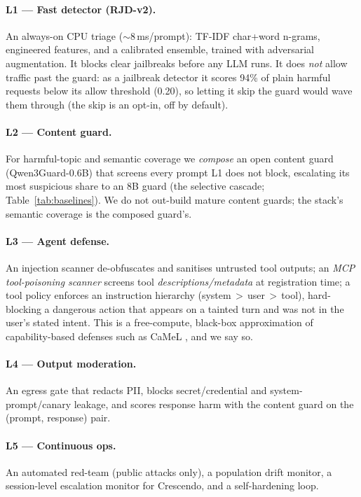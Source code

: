 \documentclass[11pt]{article}
\begin{document}
\paragraph{L1 --- Fast detector (RJD-v2).} An always-on CPU triage ($\sim$8\,ms/prompt):
TF-IDF char+word n-grams, engineered features, and a calibrated ensemble, trained with adversarial
augmentation. It blocks clear jailbreaks before any LLM runs. It does \emph{not} allow traffic past
the guard: as a jailbreak detector it scores 94\% of plain harmful requests below its allow threshold
(0.20), so letting it skip the guard would wave them through (the skip is an opt-in, off by default).

\paragraph{L2 --- Content guard.} For harmful-topic and semantic coverage we \emph{compose} an open
content guard (Qwen3Guard-0.6B) that screens every prompt L1 does not block, escalating its most
suspicious share to an 8B guard (the selective cascade; Table~\ref{tab:baselines}). We do not out-build mature
content guards; the stack's semantic coverage is the composed guard's.

\paragraph{L3 --- Agent defense.} An injection scanner de-obfuscates and sanitises untrusted tool
outputs; an \emph{MCP tool-poisoning scanner} screens tool \emph{descriptions/metadata} at
registration time; a tool policy enforces an instruction hierarchy (system\,$>$\,user\,$>$\,tool),
hard-blocking a dangerous action that appears on a tainted turn and was not in the user's stated
intent. This is a free-compute, black-box approximation of capability-based defenses such as CaMeL
\citep{camel}, and we say so.

\paragraph{L4 --- Output moderation.} An egress gate that redacts PII, blocks secret/credential and
system-prompt/canary leakage, and scores response harm with the content guard on the
(prompt, response) pair.

\paragraph{L5 --- Continuous ops.} An automated red-team (public attacks only), a population drift
monitor, a session-level escalation monitor for Crescendo, and a self-hardening loop.
\end{document}
